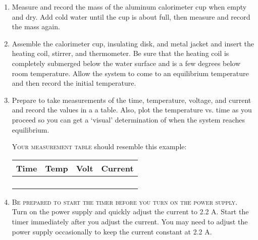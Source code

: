 \begin{enumerate}
\item
Measure and record the mass of the aluminum calorimeter cup when empty and dry.
Add cold water until the cup is about  full, then measure and record the mass again.

\item
Assemble the calorimeter cup, insulating disk, and metal jacket and insert the heating coil, stirrer, and thermometer.  Be sure that the heating coil is completely submerged below the water surface and is a few degrees below room temperature. Allow the system to come to an equilibrium temperature and then record the initial temperature.

\item
Prepare to take measurements of the time, temperature, voltage, and current and record the values in a a table. Also, plot the temperature vs. time as you proceed so you can get a `visual' determination of when the system reaches equilibrium.
\begin{marginfigure}[-36pt]
	\textsc{Your measurement table} should resemble this example:
	
	\begin{tabular}{l|l|l|l}
		Time&Temp&Volt&Current\\		\midrule\addlinespace[-2.25pt]
		\phantom{x} & \phantom{x}& \phantom{x}& \phantom{x}\\
		\midrule[0.1pt]\addlinespace[-2pt]
		\phantom{x} & \phantom{x}& \phantom{x}& \phantom{x}\\
		\midrule[0.1pt]\addlinespace[-2pt]
		\phantom{x} & \phantom{x}& \phantom{x}& \phantom{x}\\
		\midrule[0.1pt]\addlinespace[-2pt]
		\phantom{x} & \phantom{x}& \phantom{x}& \phantom{x}\\
	\end{tabular}
\end{marginfigure}

\item
\textsc{Be prepared to start the timer before you turn on the power supply.}
Turn on the power supply and quickly adjust the current to 2.2 A.  Start the timer immediately after you adjust the current.  You may need to adjust the power supply occasionally to keep the current constant at 2.2 A.  


\end{enumerate}

